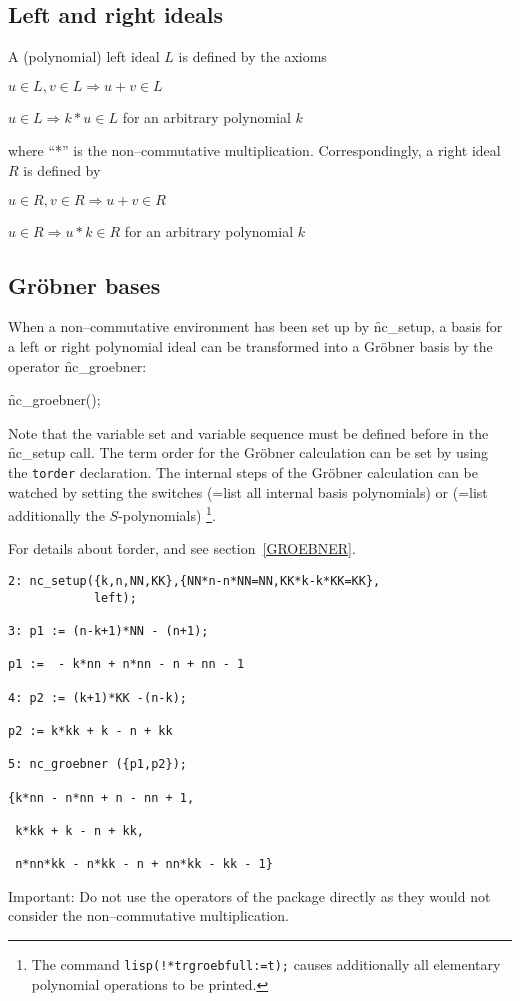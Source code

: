 \subsection{Left and right ideals}

A (polynomial) left ideal $L$ is defined by the axioms

$u \in L, v \in L \Longrightarrow u+v \in L$

$u \in L \Longrightarrow k*u \in L$ for an arbitrary polynomial $k$

where ``*'' is the non--commutative multiplication. Correspondingly,
a right ideal $R$ is defined by

$u \in R, v \in R \Longrightarrow u+v \in R$

$u \in R \Longrightarrow u*k \in R$ for an arbitrary polynomial $k$

\subsection{Gr\"obner bases}

\hypertarget{operator:NC_GROEBNER}{}
When a non--commutative environment has been set up
by \f{nc\_setup}, a basis for a left or right polynomial ideal
can be transformed into a Gr\"obner basis by the operator
\f{nc\_groebner}:
\begin{syntax}
   \f{nc\_groebner}();
\end{syntax}
Note that the variable set and variable sequence must be
defined before in the \f{nc\_setup} call. The term order
for the Gr\"obner calculation can be set by using the
\texttt{torder} declaration. The internal steps of the
Gr\"obner calculation can be watched by setting the
switches  (=list all internal basis polynomials)
or  (=list additionally the $S$-polynomials)
\footnote{The command \texttt{lisp(!*trgroebfull:=t);} causes additionally
all elementary polynomial operations to be printed.}.


For details about \f{torder},  and 
see section~\ref{GROEBNER}.
\begin{verbatim}
2: nc_setup({k,n,NN,KK},{NN*n-n*NN=NN,KK*k-k*KK=KK},
            left);

3: p1 := (n-k+1)*NN - (n+1);

p1 :=  - k*nn + n*nn - n + nn - 1

4: p2 := (k+1)*KK -(n-k);

p2 := k*kk + k - n + kk

5: nc_groebner ({p1,p2});

{k*nn - n*nn + n - nn + 1,

 k*kk + k - n + kk,

 n*nn*kk - n*kk - n + nn*kk - kk - 1}

\end{verbatim}
Important: Do not use the operators of the 
package directly as they would not consider the non--commutative
multiplication.

